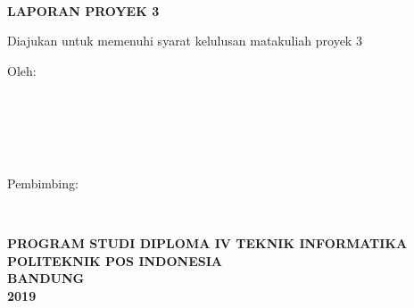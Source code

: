 \thispagestyle{empty}
\begin{center}
\begin{doublespace}
\textbf{\smaller\large{\MakeUppercase{\judul}}}\\[2.5cm]
\end{doublespace}

\textbf{\MakeUppercase{\large laporan proyek 3}}\\[0.5cm]
\begin{onehalfspace}
Diajukan untuk memenuhi syarat kelulusan matakuliah proyek 3\\[1.8cm]
\end{onehalfspace}

\large Oleh: \\
\begin{onehalfspace}
\large{\penulissatu} \\
\large{\nimsatu}\\[1.5cm]
\large{\penulisdua} \\
\large{\nimdua}\\[1.5cm]
\end{onehalfspace}
\vspace{1.5cm}

\large Pembimbing: \\
\begin{onehalfspace}
\large{\pembimbingsatu} \\
\large{\pembimbingdua}
\end{onehalfspace}

\vfill

\textbf{\large \MakeUppercase{program studi diploma iv teknik informatika}}\\
\textbf{\large \MakeUppercase{politeknik pos indonesia}}\\
\textbf{\large \MakeUppercase{bandung}}\\
\textbf{\large 2019}\\
\end{center}
